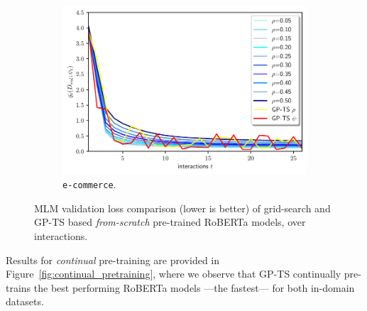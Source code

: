 \begin{figure}[!th]
\begin{subfigure}[c]{0.32\textwidth}
		\label{fig:pretraining_new_mimic}
	\end{subfigure}
	\begin{subfigure}[c]{0.32\textwidth}
		\includegraphics[width=\textwidth]{./figs/ebay_new_pre_training_loss}
		\vspace*{-4ex}
		\caption{\texttt{e-commerce}.}
		\label{fig:pretraining_new_ebay}
	\end{subfigure}
	\vspace*{-1ex}
	\caption{MLM validation loss comparison (lower is better) of grid-search and GP-TS based \textit{from-scratch} pre-trained RoBERTa models, over interactions.
	}
	\label{fig:new_pretraining}
\end{figure}

Results for \textit{continual} pre-training are provided in Figure~\ref{fig:continual_pretraining},
where we observe that GP-TS continually pre-trains the best performing RoBERTa models ---the fastest--- for both in-domain datasets.

